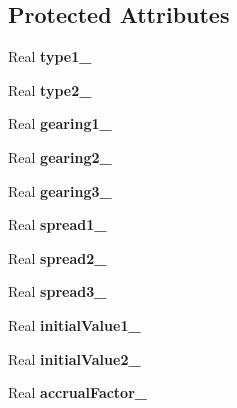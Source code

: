 \subsection*{Protected Attributes}
\begin{DoxyCompactItemize}
\item 
Real {\bfseries type1\+\_\+}\label{class_quant_lib_1_1_double_sticky_ratchet_payoff_ad24a0e32b0e1ef133aa435c9eba96b35}

\item 
Real {\bfseries type2\+\_\+}\label{class_quant_lib_1_1_double_sticky_ratchet_payoff_a0372192d2144df36d1af0c1161786036}

\item 
Real {\bfseries gearing1\+\_\+}\label{class_quant_lib_1_1_double_sticky_ratchet_payoff_a8046cec03e69e1f17ffe01eb63976af4}

\item 
Real {\bfseries gearing2\+\_\+}\label{class_quant_lib_1_1_double_sticky_ratchet_payoff_ab5fcf21eab8ea40868d718bf713c7d4b}

\item 
Real {\bfseries gearing3\+\_\+}\label{class_quant_lib_1_1_double_sticky_ratchet_payoff_a16c2a7eb10e84a933465bc4310fa5397}

\item 
Real {\bfseries spread1\+\_\+}\label{class_quant_lib_1_1_double_sticky_ratchet_payoff_a7227899545fd0c20d59284e82074ee18}

\item 
Real {\bfseries spread2\+\_\+}\label{class_quant_lib_1_1_double_sticky_ratchet_payoff_af969b6d75a8eb2decd86c871289f71b4}

\item 
Real {\bfseries spread3\+\_\+}\label{class_quant_lib_1_1_double_sticky_ratchet_payoff_a93bea73e1627c4abec3896dd96d9cc6d}

\item 
Real {\bfseries initial\+Value1\+\_\+}\label{class_quant_lib_1_1_double_sticky_ratchet_payoff_ad55f89fdb7cfbe535d8a1398be72c1e2}

\item 
Real {\bfseries initial\+Value2\+\_\+}\label{class_quant_lib_1_1_double_sticky_ratchet_payoff_ac8f293997019d5a3287f8453ec710fdc}

\item 
Real {\bfseries accrual\+Factor\+\_\+}\label{class_quant_lib_1_1_double_sticky_ratchet_payoff_acb6216c7bdbe807c4ef1e2bc2cc6b7d4}

\end{DoxyCompactItemize}


